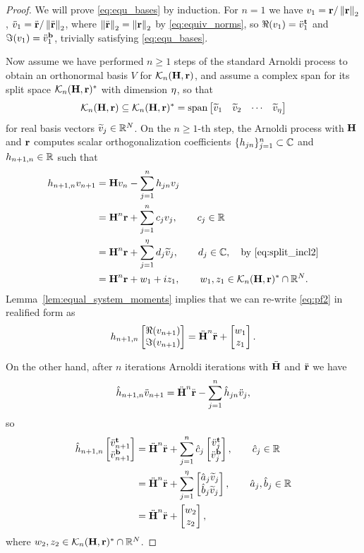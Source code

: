 \medskip
\begin{proof}
We will prove \eqref{eq:equ_bases} by induction.
For $n=1$ we have $v_1 = \textbf{\textup{r}}/\left\| \textbf{\textup{r}} \right\|_{2}$, $\ddot{v}_1 = \ddot{\textbf{\textup{r}}} / \left\| \ddot{\textbf{\textup{r}}} \right\|_{2}$, where $\left\| \ddot{\textbf{\textup{r}}} \right\|_{2}=\left\| \textbf{\textup{r}} \right\|_{2}$ by  \eqref{eq:equiv_norms}, so $\Re(v_1) = \ddot{v}^{\mathrm{\bf{t}}}_{1}$ and
$\Im(v_1) = \ddot{v}^{\mathrm{\bf{b}}}_{1}$, trivially satisfying \eqref{eq:equ_bases}.
   
Now assume we have performed $n\geq 1$ steps of the standard Arnoldi process to obtain an orthonormal basis $V$ for $\mathcal{K}_{n}({\textbf{\textup{H}}},{\textbf{\textup{r}}})$, and assume a complex span for its split space $\mathcal{K}_{n}({\textbf{\textup{H}}},{\textbf{\textup{r}}})^*$ with dimension $\eta$, so that 
\begin{equation}
\krylov{n}{\H}{\Rr} \subseteq \krylov{n}{\H}{\Rr}^*=\spn\mat{\vt_1 & \vt_2&\cdots&\vt_\nsplit}
\label{eq:split_incl2}
\end{equation}
for real basis vectors $\widetilde{v}_j\in\mathbb{R}^N$.
On the $n\geq 1$-th step,  the Arnoldi process with $\textbf{\textup{H}}$ and $\textbf{\textup{r}}$ computes scalar orthogonalization coefficients $\{h_{jn}\}_{j=1}^n\subset\mathbb{C}$  and $h_{n+1,n}\in\mathbb{R}$ such that 
	\begin{align}
	h_{n+1,n}v_{n+1} &= \H v_{n} - \sum_{j=1}^{n} h_{jn} v_j \nonumber\\
	 &= \H^{n}\Rr + \sum_{j=1}^{n} c_j v_j, \qquad  c_j\in\R \nonumber\\
	 &= \H^{n}\Rr + \sum_{j=1}^{\nsplit} d_j\vt_j, \qquad d_j\in\C,\quad \text{by \eqref{eq:split_incl2}} \nonumber\\
	 &= \H^{n}\Rr + w_1 + iz_1, \qquad w_1,z_1\in\krylov{n}{\H}{\Rr}^* \cap \R^N.
\label{eq:pf2}
	\end{align}
Lemma~\ref{lem:equal_system_moments} implies that we can re-write \eqref{eq:pf2} in realified form as
\begin{equation}
h_{n+1,n}\mat{\Re(v_{n+1})\\ \Im(v_{n+1})} = \Heq^{n}\req + \mat{w_1\\z_1}.
\label{eq:cplx_prog}
\end{equation}

On the other hand, after $n$ iterations Arnoldi iterations with ${\ddot{\textbf{\textup{H}}}}$ and $\ddot{\textbf{\textup{r}}}$ we have
\[
\hat{h}_{n+1,n}\ddot{v}_{n+1} = {\ddot{\textbf{\textup{H}}}}^{n}\ddot{\textbf{\textup{r}}} - \sum_{j=1}^{n} \hat{h}_{jn}\ddot{v}_j,
\]
so
\begin{align*}
\heq_{n+1,n}\mat{\tp{\veq}{n+1}\\ \bt{\veq}{n+1}}
 &= \Heq^{n}\req + \sum_{j=1}^{n} \hat{c}_j\mat{\tp{\veq}{j}\\\bt{\veq}{j}}, \qquad \hat{c}_j\in\R  \\
&= \Heq^{n}\req + \sum_{j=1}^{\nsplit} \mat{\hat{a}_j\vt_j \\ \hat{b}_j\vt_j},
\qquad \hat{a}_j,\hat{b}_j \in\R\\
&= \Heq^{n}\req + \mat{w_2 \\ z_2},
\label{eq:eqreal_prog}
\end{align*}
where $w_2,z_2\in\mathcal{K}_{n}({\textbf{\textup{H}}},{\textbf{\textup{r}}})^* \cap \mathbb{R}^N$.
\end{proof}

